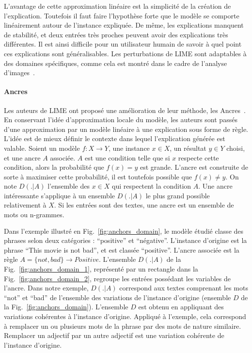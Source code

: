 L'avantage de cette approximation linéaire est la simplicité de la création de l'explication. Toutefois il faut faire l'hypothèse forte que le modèle se comporte linéairement autour de l'instance expliquée. De même, les explications manquent de stabilité, et deux entrées très proches peuvent avoir des explications très différentes. Il est ainsi difficile pour un utilisateur humain de savoir à quel point ces explications sont généralisables.
Les perturbations de LIME sont adaptables à des domaines spécifiques, comme cela est montré dans le cadre de l'analyse d'images~\cite{Stieler2021}.


\paragraph{Ancres}\label{paragraph:anchors}
Les auteurs de LIME ont proposé une amélioration de leur méthode, les Ancres~\cite{Ribeiro2018}. En conservant l'idée d'approximation locale du modèle, les auteurs sont passés d'une approximation par un modèle linéaire à une explication sous forme de règle. L'idée est de mieux définir le contexte dans lequel l'explication générée est valable.
Soient un modèle $f : X \rightarrow Y$, une instance $x \in X$, un résultat $y \in Y$ choisi, et une ancre $A$ associée. $A$ est une condition telle que si $x$ respecte cette condition, alors la probabilité que $f(x) = y$ est grande. L'ancre est construite de sorte à maximiser cette probabilité, il est toutefois possible que $f(x) \neq y$.
On note $D(.|A)$ l'ensemble des $x \in X$ qui respectent la condition $A$. Une ancre intéressante s'applique à un ensemble $D(.|A)$ le plus grand possible relativement à $X$.
Si les entrées sont des textes, une ancre est un ensemble de mots ou n-grammes.

Dans l'exemple illustré en Fig.~\ref{fig:anchors_domain}, le modèle étudié classe des phrases selon deux catégories : ``positive'' et ``négative''. L'instance d'origine est la phrase ``This movie is not bad'', et est classée ``positive''. L'ancre associée est la règle $A = \{not, bad\} \rightarrow Positive $.
L'ensemble $D(.|A)$  de la Fig.~\ref{fig:anchors_domain_1}, représenté par un rectangle dans la Fig.~\ref{fig:anchors_domain_2}, regroupe les entrées possédant les variables de l'ancre. Dans notre exemple, $D(.|A)$ correspond aux textes comprenant les mots ``not'' et ``bad'' de l'ensemble des variations de l'instance d'origine (ensemble $D$ de la Fig.~\ref{fig:anchors_domain}). L'ensemble $D$ est obtenu en appliquant des variations cohérentes à l'instance d'origine. Appliqué à l'exemple, cela correspond à remplacer un ou plusieurs mots de la phrase par des mots de nature similaire. Remplacer un adjectif par un autre adjectif est une variation cohérente de l'instance d'origine.


